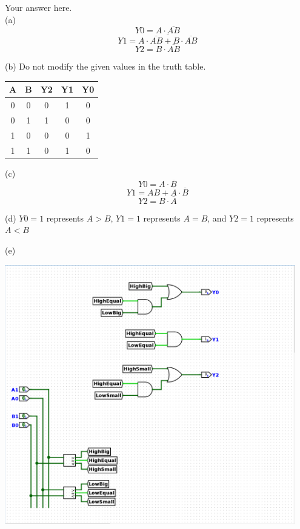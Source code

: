 \documentclass[a4paper]{article}
\begin{document}
\begin{answer}[Question 1]
    Your answer here.\\
    (a)
    $$Y0 = A \cdot \overline{AB}$$
    $$Y1 = \overline{A \cdot \overline{AB} + B \cdot \overline{AB}}$$
    $$Y2 = B \cdot \overline{AB}$$

    (b) Do not modify the given values in the truth table.\\
    \begin{center}
        \begin{tabular}{ |c|c||c|c|c| }
            \hline
            A & B & Y2 & Y1 & Y0 \\
            \hline
            0 & 0 & 0  & 1  & 0  \\
            \hline
            0 & 1 & 1  & 0  & 0  \\
            \hline
            1 & 0 & 0  & 0  & 1  \\
            \hline
            1 & 1 & 0  & 1  & 0  \\
            \hline
        \end{tabular}
    \end{center}

    (c)
    $$Y0 = A \cdot \overline{B}$$
    $$Y1 = AB + \overline{A} \cdot \overline{B}$$
    $$Y2 = B \cdot \overline{A}$$

    (d) $Y0=1$ represents $A>B$, $Y1=1$ represents $A=B$, and $Y2=1$ represents $A<B$

    (e)

    \includegraphics[width=0.95\textwidth]{Q1_comparator_2.png}


\end{answer}
\end{document}
